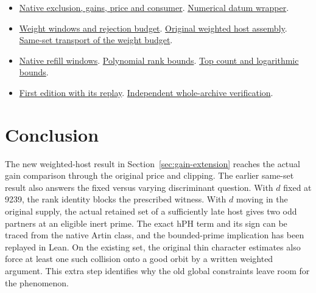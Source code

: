 \documentclass[12pt,letterpaper]{article}
\DeclareRobustCommand{\id}[1]{\mbox{\small\ttfamily #1}}
\newcommand{\old}[3]{\href{https://github.com/nousentllc/riemann-hypothesis/blob/40e56bab026552e089d7afcfeff08d2defb9c005/src/#1\#L#2}{#3}}
\begin{document}
\begin{itemize}[leftmargin=*]
\item \old{Formalism/LocalToGlobal/GlobalTheory/IsResidueClassZero.lean}{149}{Native exclusion, gains, price and consumer}. \old{Formalism/LocalToGlobal/GlobalTheory/IsResidueClassZero.lean}{334}{Numerical datum wrapper}.
\item \old{Development/AbelianVarietyTheory/Definitions/GlobalTwisting/ThinScalesIffHostBound.lean}{143}{Weight windows and rejection budget}. \old{Development/AutomorphicArithmetic/CharacterBoxes/HostWW.lean}{27}{Original weighted host assembly}. \old{Development/AbelianVarietyTheory/Proofs/GlobalInterpolation/WeightWindowRequirementHostOfPoint.lean}{17}{Same-set transport of the weight budget}.
\item \old{Development/AbelianVarietyTheory/Proofs/GlobalInterpolation/ExistsRefill.lean}{124}{Native refill windows}. \old{Development/AbelianVarietyTheory/Proofs/GlobalInterpolation/ExplicitRanksBasicBoundsLargeScale.lean}{22}{Polynomial rank bounds}. \old{Development/AbelianVarietyTheory/Proofs/GlobalInterpolation/GoodTopCountLeConstMulLog.lean}{65}{Top count and logarithmic bounds}.
\item \href{https://github.com/nousentllc/riemann-hypothesis/commit/cc2e70880ad9f9cb73c962d050fab6dd9fe97542}{First edition with its replay}. \href{https://math.mit.edu/~drew/grh/}{Independent whole-archive verification}.
\end{itemize}

\section{Conclusion}

The new weighted-host result in Section~\ref{sec:gain-extension} reaches the actual gain comparison through the original price and clipping. The earlier same-set result also answers the fixed versus varying discriminant question. With \(d\) fixed at 9239, the rank identity blocks the prescribed witness. With \(d\) moving in the original supply, the actual retained set of a sufficiently late host gives two odd partners at an eligible inert prime. The exact \id{hPH} term and its sign can be traced from the native Artin class, and the bounded-prime implication has been replayed in Lean. On the existing set, the original thin character estimates also force at least one such collision onto a good orbit by a written weighted argument. This extra step identifies why the old global constraints leave room for the phenomenon.
\end{document}
